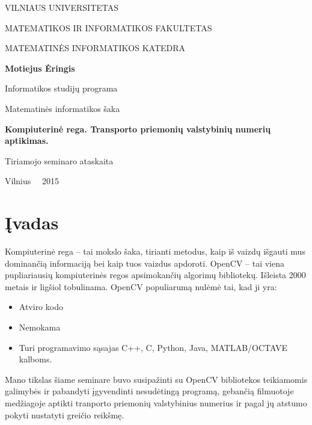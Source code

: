 \documentclass[a4paper,12pt]{article}
\begin{document}
\thispagestyle{empty} %

\begin{center}
 VILNIAUS UNIVERSITETAS 
 
MATEMATIKOS IR INFORMATIKOS FAKULTETAS

MATEMATINĖS INFORMATIKOS KATEDRA

\vspace{4cm}

\textbf{Motiejus Ėringis}

Informatikos studijų programa

Matematinės informatikos šaka


\vspace{3cm}

\textbf{\Large Kompiuterinė rega. Transporto priemonių valstybinių numerių aptikimas.}

Tiriamojo seminaro ataskaita

\vspace{4cm}

\vfill

Vilnius \ \  2015
\end{center}

\clearpage


\newpage
\tableofcontents

\newpage

\section*{Įvadas}

Kompiuterinė rega – tai mokslo šaka, tirianti metodus, kaip iš vaizdų išgauti mus dominančią informaciją bei kaip tuos vaizdus apdoroti. OpenCV – tai viena pupliariausių kompiuterinės regos apsimokančių algorimų bibliotekų. Išleista 2000 metais ir ligšiol tobulinama. OpenCV populiarumą nulėmė tai, kad ji yra:
\begin{itemize}
  \item Atviro kodo
  \item Nemokama
  \item Turi programavimo sąsajas C++, C, Python, Java, MATLAB/OCTAVE kalboms.
\end{itemize}

Mano tikslas šiame seminare buvo susipažinti su OpenCV bibliotekos teikiamomis galimybės ir pabandyti įgyvendinti nesudėtingą programą, gebančią filmuotoje medžiagoje aptikti tranporto priemonių valstybinius numerius ir pagal jų atstumo pokyti nustatyti greičio reikšmę.
\end{document}
